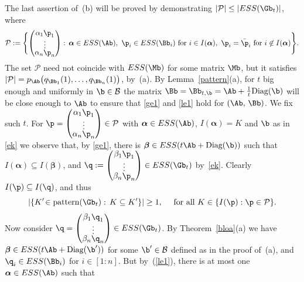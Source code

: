 \documentclass[moor]{informs3}              %
\def\reff#1{(\ref{#1})}
\def\irg#1#2{{ \in\! [{#1}\! : \! {#2}]}}
\begin{document}
The last assertion of~(b) will be proved by demonstrating $|\mathcal{P}|\le|ESS(\Gb_t)|$, where
\begin{equation}\label{e:P}
\renewcommand*{\arraystretch}{.5}
\mathcal{P}:=\Biggl\{\begin{pmatrix}
\alpha_1\p_1 \\
\vdots \\
\alpha_n\p_n
\end{pmatrix}:\, \bm{\alpha}\in ESS(\Ab),\ \p_i\in ESS(\Bb_i)\textup{ for }i\in I(\bm{\alpha}),\ \p_i=\bar\p_i\textup{ for }i\not\in I(\bm{\alpha})
\Biggr\}.
\end{equation}
The set $\mathcal{P}$ need not coincide with $ESS(\Mb)$ for some matrix $\Mb$, but it satisfies $|\mathcal{P}|=p_{\Ab}\big(q_{\Bb_1}(1),\ldots,q_{\Bb_n}(1)\big)$,
by~(a). By Lemma~\ref{pattern}(a), for $t$ big enough and uniformly in $\b\in\mathcal{B}$ the matrix
$\Bb=\Bb_{t,\b}=\Ab+\tfrac1t\textup{Diag}(\b)$ will be close enough to $\Ab$ to ensure that
\eqref{ge1} and \eqref{le1} hold for $(\Ab,\,\Bb)$. We fix such $t$.
For $\renewcommand*{\arraystretch}{.5}
\p=\begin{pmatrix}
\alpha_1\p_1 \\
\vdots \\
\alpha_n\p_n
\end{pmatrix}
\in \mathcal{P}$ with $\bm{\alpha} \in ESS(\Ab)$, $I(\bm{\alpha})=K$ and $\b$ as in \eqref{ek}
we observe that, by \eqref{ge1}, there is $\bm{\beta}\in ESS(t\Ab+\textup{Diag}(\b))$ such that $I(\bm{\alpha})\subseteq I(\bm{\beta})$,
and $\renewcommand*{\arraystretch}{.5}
\q:=\begin{pmatrix}
\beta_1\p_1 \\
\vdots \\
\beta_n\p_n
\end{pmatrix}
\in ESS(\Gb_t)$ by~\eqref{ek}. Clearly $I(\p)\subseteq I(\q)$, and thus
\begin{equation}\label{ggee11}
|\{K'\!\in\textup{pattern}(\Gb_t):\,K\subseteq K'\}|\ge1,\quad \textup{ for all }K\in\{I(\p):\p\in\mathcal{P}\}.
\end{equation}
Now consider $\renewcommand*{\arraystretch}{.5}
\q=\begin{pmatrix}
\beta_1\q_1 \\
\vdots \\
\beta_n\q_n
\end{pmatrix}
\in ESS(\Gb_t)$. By Theorem~\ref{bloa}(a) we have $\bm{\beta}\in ESS(t\Ab+\textup{Diag}(\b'))$ for some $\b'\in\mathcal{B}$ defined as in the proof of~(a), and $\q_i\in ESS(\Bb_i)$ for $i\irg 1n$. But by~\reff{le1}, there is at most one $\bm{\alpha}\in ESS(\Ab)$ such that
\end{document}
